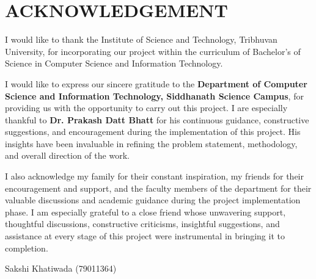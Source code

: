 \chapter*{ACKNOWLEDGEMENT}

I would like to thank the Institute of Science and Technology, Tribhuvan University, for incorporating our  project within the curriculum of Bachelor’s of Science in Computer Science and Information Technology. \par

I would like to express our sincere gratitude to the \textbf{Department of Computer Science and Information Technology, Siddhanath Science Campus}, for providing us with the opportunity to carry out this project. I are especially thankful to \textbf{ Dr. Prakash Datt Bhatt} for his continuous guidance, constructive suggestions, and encouragement during the implementation of this project. His insights have been invaluable in refining the problem statement, methodology, and overall direction of the work. \par

I also acknowledge my family for their constant inspiration, my friends for their encouragement and support, and the faculty members of the department for their valuable discussions and academic guidance during the project implementation phase. I am especially grateful to a close friend whose unwavering support, thoughtful discussions, constructive criticisms, insightful suggestions, and assistance at every stage of this project were instrumental in bringing it to completion.  \par

\vspace{1cm}

Sakshi Khatiwada \qquad (79011364)
